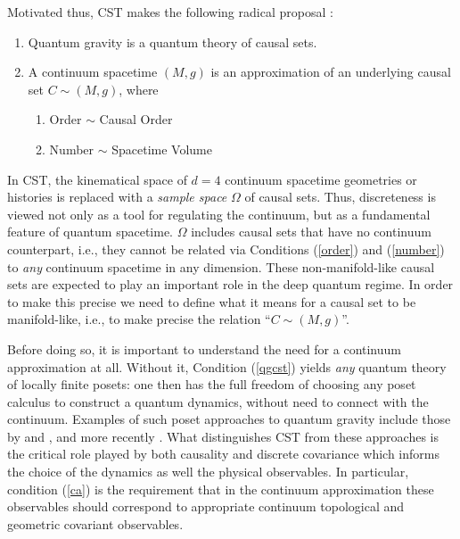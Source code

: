 Motivated thus, CST makes the following  radical proposal \citep{blms}:  
\begin{enumerate}    
\item \label{qgcst} Quantum gravity is a quantum theory of causal sets. 
\item  \label{ca} 
A continuum spacetime $(M,g)$ is an approximation of an underlying causal set $C \sim (M,g)$, where  
\begin{enumerate}  
\item  \label{order} Order $\sim $ Causal Order 
\item  \label{number} Number $\sim $ Spacetime Volume 
\end{enumerate} 
\end{enumerate} 



In CST, the {kinematical} space of $d=4$ continuum spacetime geometries or histories is replaced with a \emph{
  sample space} $\Omega$ of causal sets.  Thus,  discreteness is viewed not only as a tool for regulating the
continuum, but as a fundamental feature of quantum spacetime. $\Omega$ includes causal sets that
have no continuum counterpart, i.e., they cannot be related via Conditions (\ref{order})  and
(\ref{number}) to \emph{any}  continuum spacetime in any dimension. These non-manifold-like causal sets are expected to
play an important role in the deep quantum regime. In order to make this precise we need to define what it means for a
causal set to be manifold-like, i.e., to make precise the relation ``$C \sim (M,g)$''.  


Before doing so, it is important to understand the need for a continuum approximation at all.  Without it, Condition
(\ref{qgcst}) yields  \emph{any}  quantum theory of locally finite posets: one then has the full freedom of choosing any poset calculus to construct
a quantum dynamics, without need to connect with the continuum.   Examples of such poset approaches to quantum gravity
include those by  \cite{finkelstein} and \cite{hemion}, and more recently \cite{lee}. What distinguishes CST from
these approaches is the critical role played by both causality and discrete covariance which informs the choice of the
dynamics as well the physical observables.  In particular, condition (\ref{ca}) is the requirement  that in the continuum approximation these observables should
correspond to appropriate continuum topological and geometric covariant observables. 




